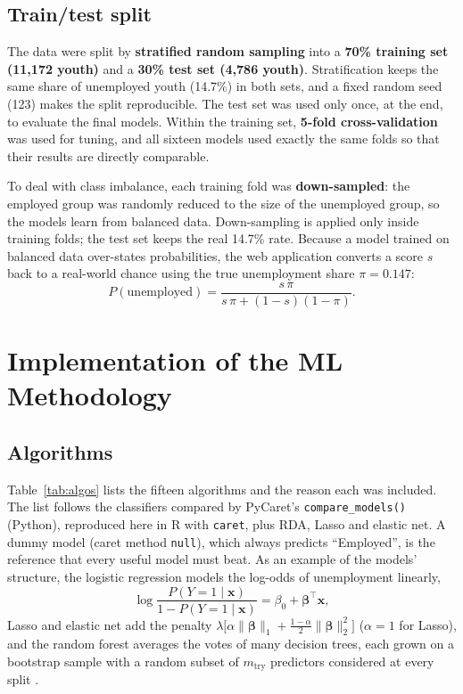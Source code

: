 \documentclass[11pt,a4paper]{article}
\begin{document}
\subsection{Train/test split}
The data were split by \textbf{stratified random sampling} into a \textbf{70\% training set (11{,}172
youth)} and a \textbf{30\% test set (4{,}786 youth)}. Stratification keeps the same share of
unemployed youth (14.7\%) in both sets, and a fixed random seed (123) makes the split reproducible.
The test set was used only once, at the end, to evaluate the final models. Within the training set,
\textbf{5-fold cross-validation} was used for tuning, and all sixteen models used exactly the same folds
so that their results are directly comparable.

To deal with class imbalance, each training fold was \textbf{down-sampled}: the employed group was
randomly reduced to the size of the unemployed group, so the models learn from balanced data.
Down-sampling is applied only inside training folds; the test set keeps the real 14.7\% rate. Because
a model trained on balanced data over-states probabilities, the web application converts a score $s$
back to a real-world chance using the true unemployment share $\pi=0.147$:
\begin{equation}
P(\text{unemployed}) = \frac{s\,\pi}{s\,\pi+(1-s)(1-\pi)}.
\label{eq:prior}
\end{equation}

\section{Implementation of the ML Methodology}

\subsection{Algorithms}
Table~\ref{tab:algos} lists the fifteen algorithms and the reason each was included. The list
follows the classifiers compared by PyCaret's \texttt{compare\_models()} (Python), reproduced here in
R with \texttt{caret}, plus RDA, Lasso and elastic net. A dummy model (caret method \texttt{null}),
which always predicts ``Employed'', is the reference that every useful model must beat. As an example of the
models' structure, the logistic regression models the log-odds of unemployment linearly,
\begin{equation}
\log\frac{P(Y=1\mid\mathbf{x})}{1-P(Y=1\mid\mathbf{x})}=\beta_0+\boldsymbol{\beta}^{\top}\mathbf{x},
\end{equation}
Lasso and elastic net add the penalty
$\lambda\big[\alpha\lVert\boldsymbol\beta\rVert_1+\tfrac{1-\alpha}{2}\lVert\boldsymbol\beta\rVert_2^2\big]$
($\alpha=1$ for Lasso), and the random forest averages the votes of many decision trees, each grown on
a bootstrap sample with a random subset of $m_{\text{try}}$ predictors considered at every split
\cite{breiman}.
\end{document}
